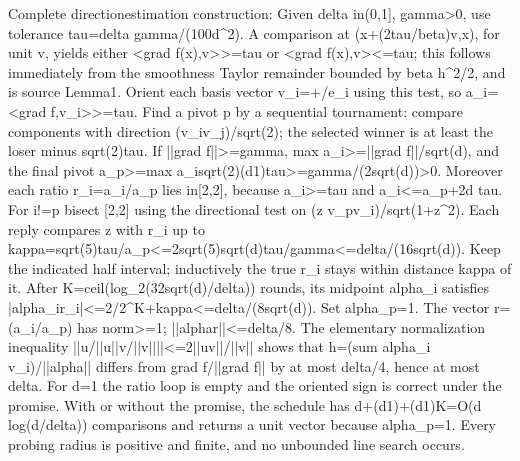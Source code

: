 \documentclass[10pt,a4paper]{article}
\begin{document}
Complete directionestimation construction: Given delta in(0,1], gamma>0, use tolerance tau=delta gamma/(100d\textasciicircum{}2). A comparison at (x+(2tau/beta)v,x), for unit v, yields either <grad f(x),v>>=tau or <grad f(x),v><=tau; this follows immediately from the smoothness Taylor remainder bounded by beta h\textasciicircum{}2/2, and is source Lemma1. Orient each basis vector v\_i=+/e\_i using this test, so a\_i=<grad f,v\_i>>=tau. Find a pivot p by a sequential tournament: compare components with direction (v\_iv\_j)/sqrt(2); the selected winner is at least the loser minus sqrt(2)tau. If ||grad f||>=gamma, max a\_i>=||grad f||/sqrt(d), and the final pivot a\_p>=max a\_isqrt(2)(d1)tau>=gam\allowbreak{}ma/(2sqrt(d))>0. Moreover each ratio r\_i=a\_i/a\_p lies in[2,2], because a\_i>=tau and a\_i<=a\_p+2d tau. For i!=p bisect [2,2] using the directional test on (z v\_pv\_i)/sqrt(1+z\textasciicircum{}2). Each reply compares z with r\_i up to kappa=sqrt(5)tau/a\_p<=2s\allowbreak{}qrt(5)sqrt(d)tau/gamma<=\allowbreak{}delta/(16sqrt(d)). Keep the indicated half interval; inductively the true r\_i stays within distance kappa of it. After K=ceil(log\_2(32sqrt(d)/delta)) rounds, its midpoint alpha\_i satisfies |alpha\_ir\_i|<=2/2\textasciicircum{}K+kap\allowbreak{}pa<=delta/(8sqrt(d)). Set alpha\_p=1. The vector r=(a\_i/a\_p) has norm>=1; ||alphar||<=delta/8. The elementary normalization inequality ||u/||u||v/||v||||<=2||uv||/||v|| shows that h=(sum alpha\_i v\_i)/||alpha|| differs from grad f/||grad f|| by at most delta/4, hence at most delta. For d=1 the ratio loop is empty and the oriented sign is correct under the promise. With or without the promise, the schedule has d+(d1)+(d1)K=O(d log(d/delta)) comparisons and returns a unit vector because alpha\_p=1. Every probing radius is positive and finite, and no unbounded line search occurs.
\end{document}
